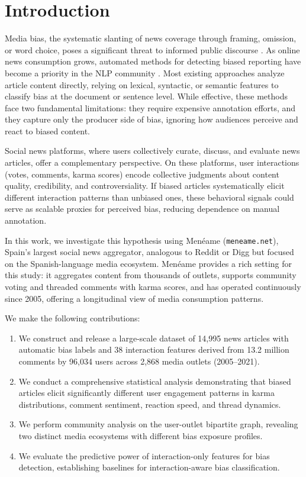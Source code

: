 \section{Introduction}
\label{sec:introduction}

Media bias, the systematic slanting of news coverage through framing, omission, or word choice, poses a significant threat to informed public discourse \cite{hamborg2019automated}.
As online news consumption grows, automated methods for detecting biased reporting have become a priority in the NLP community \cite{rodrigo2024systematic}.
Most existing approaches analyze article content directly, relying on lexical, syntactic, or semantic features to classify bias at the document or sentence level.
While effective, these methods face two fundamental limitations: they require expensive annotation efforts, and they capture only the producer side of bias, ignoring how audiences perceive and react to biased content.

Social news platforms, where users collectively curate, discuss, and evaluate news articles, offer a complementary perspective.
On these platforms, user interactions (votes, comments, karma scores) encode collective judgments about content quality, credibility, and controversiality.
If biased articles systematically elicit different interaction patterns than unbiased ones, these behavioral signals could serve as scalable proxies for perceived bias, reducing dependence on manual annotation.

In this work, we investigate this hypothesis using Men\'eame (\texttt{meneame.net}), Spain's largest social news aggregator, analogous to Reddit or Digg but focused on the Spanish-language media ecosystem.
Men\'eame provides a rich setting for this study: it aggregates content from thousands of outlets, supports community voting and threaded comments with karma scores, and has operated continuously since 2005, offering a longitudinal view of media consumption patterns.

We make the following contributions:
\begin{enumerate}
    \item We construct and release a large-scale dataset of 14,995 news articles with automatic bias labels and 38 interaction features derived from 13.2 million comments by 96,034 users across 2,868 media outlets (2005--2021).
    \item We conduct a comprehensive statistical analysis demonstrating that biased articles elicit significantly different user engagement patterns in karma distributions, comment sentiment, reaction speed, and thread dynamics.
    \item We perform community analysis on the user-outlet bipartite graph, revealing two distinct media ecosystems with different bias exposure profiles.
    \item We evaluate the predictive power of interaction-only features for bias detection, establishing baselines for interaction-aware bias classification.
\end{enumerate}

